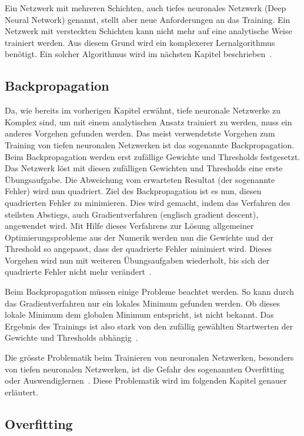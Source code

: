 Ein Netzwerk mit mehreren Schichten, auch tiefes neuronales Netzwerk (Deep Neural Network) genannt, stellt aber neue Anforderungen an das Training. Ein Netzwerk mit versteckten Schichten kann nicht mehr auf eine analytische Weise trainiert werden. Aus diesem Grund wird ein komplexerer Lernalgorithmus benötigt. Ein solcher Algorithmus wird im nächsten Kapitel beschrieben~\autocite{Krogh2008}. 

\subsection{Backpropagation}
\label{chap:backpropagation}

Da, wie bereits im vorherigen Kapitel erwähnt, tiefe neuronale Netzwerke zu Komplex sind, um mit einem analytischen Ansatz trainiert zu werden, muss ein anderes Vorgehen gefunden werden. Das meist verwendetste Vorgehen zum Training von tiefen neuronalen Netzwerken ist das sogenannte Backpropagation. Beim Backpropagation werden erst zufällige Gewichte und Thresholds festgesetzt. Das Netzwerk löst mit diesen zufälligen Gewichten und Thresholds eine erste Übungsaufgabe. Die Abweichung vom erwarteten Resultat (der sogenannte Fehler) wird nun quadriert. Ziel des Backpropagation ist es nun, diesen quadrierten Fehler zu minimieren. Dies wird gemacht, indem das Verfahren des steilsten Abstiegs, auch Gradientverfahren (englisch gradient descent), angewendet wird. Mit Hilfe dieses Verfahrens zur Lösung allgemeiner Optimierungsprobleme aus der Numerik werden nun die Gewichte und der Threshold so angepasst, dass der quadrierte Fehler minimiert wird. Dieses Vorgehen wird nun mit weiteren Übungsaufgaben wiederholt, bis sich der quadrierte Fehler nicht mehr verändert~\autocite{Krogh2008}.

Beim Backpropagation müssen einige Probleme beachtet werden. So kann durch das Gradientverfahren nur ein lokales Minimum gefunden werden. Ob dieses lokale Minimum dem globalen Minimum entspricht, ist nicht bekannt. Das Ergebnis des Trainings ist also stark von den zufällig gewählten Startwerten der Gewichte und Thresholds abhängig~\autocite{Krogh2008}.

Die grösste Problematik beim Trainieren von neuronalen Netzwerken, besonders von tiefen neuronalen Netzwerken, ist die Gefahr des sogenannten Overfitting oder Auswendiglernen~\autocite{Krogh2008}. Diese Problematik wird im folgenden Kapitel genauer erläutert.

\subsection{Overfitting}

